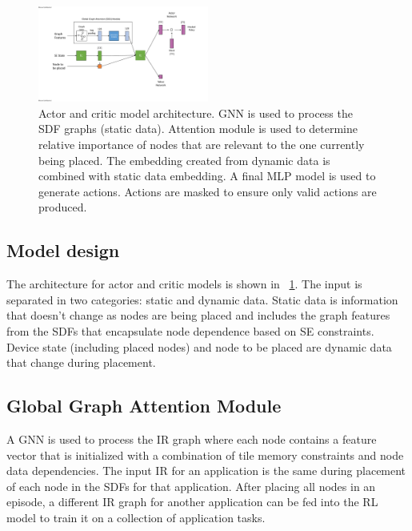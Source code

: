 \begin{figure}[tb]
  \centering
  \includegraphics[trim=12 25 15 5, clip, width=0.5\textwidth]{fig/model_diagram.pdf}
  \caption{Actor and critic model architecture. 
  GNN is used to process the SDF graphs (static data). 
  Attention module is used to determine relative importance of nodes that are relevant to the one currently being placed. 
  The embedding created from dynamic data is combined with static data embedding. 
  A final MLP model is used to generate actions. 
  Actions are masked to ensure only valid actions are produced. }
  \label{fig:model}
\end{figure}

\subsection{Model design}
The architecture for actor and critic models is shown in \figurename~\ref{fig:model}.
The input is separated in two categories: static and dynamic data. 
Static data is information that doesn't change as nodes are being placed and includes the graph features from the SDFs that encapsulate node dependence based on SE constraints.
Device state (including placed nodes) and node to be placed are dynamic data that change during placement.

\subsection{Global Graph Attention Module}

A GNN is used to process the IR graph where each node contains a feature vector that is initialized with a combination of tile memory constraints and node data dependencies. 
The input IR for an application is the same during placement of each node in the SDFs for that application.
After placing all nodes in an episode, a different IR graph for another application can be fed into the RL model to train it on a collection of application tasks. 

